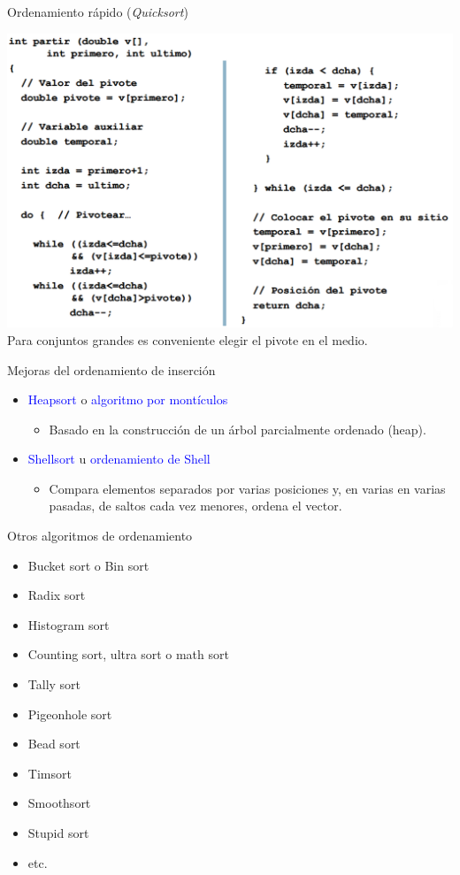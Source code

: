 \documentclass{beamer} %
\newcommand{\blue}[1]{\textcolor{blue}{#1}}
\begin{document}
\begin{frame}{Ordenamiento rápido ({\em Quicksort})}
    \begin{center}
        \includegraphics[width=.9\textwidth]{./image/cap5/quicksort3.png}\\
        {\scriptsize Para conjuntos grandes es conveniente elegir el pivote en el medio.}
    \end{center}
\end{frame}

\begin{frame}{Mejoras del ordenamiento de inserción}
    \begin{itemize}
        \item \blue{Heapsort} o \blue{algoritmo por montículos}
        \begin{itemize}
            \item Basado en la construcción de un árbol parcialmente ordenado (heap).
        \end{itemize}
        \item \blue{Shellsort} u \blue{ordenamiento de Shell}
        \begin{itemize}
            \item Compara elementos separados por varias posiciones y, en varias en varias pasadas, de saltos cada vez menores, ordena el vector.
        \end{itemize}
    \end{itemize}
\end{frame}


\begin{frame}{Otros algoritmos de ordenamiento}
    \begin{itemize}
        \item Bucket sort o Bin sort
        \item Radix sort
        \item Histogram sort
        \item Counting sort, ultra sort o math sort
        \item Tally sort
        \item Pigeonhole sort
        \item Bead sort
        \item Timsort
        \item Smoothsort
        \item Stupid sort
        \item etc.
    \end{itemize}
\end{frame}
\end{document}
